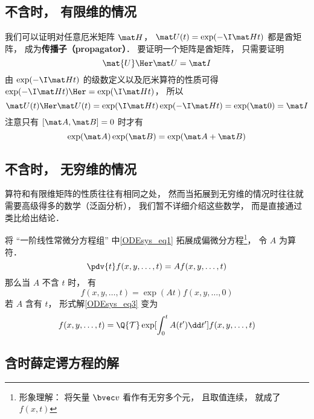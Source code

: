 

\subsection{不含时， 有限维的情况}
我们可以证明对任意厄米矩阵 $\mat H$， $\mat U(t) = \exp(-\I \mat H t)$ 都是酋矩阵， 成为\textbf{传播子（propagator）}． 要证明一个矩阵是酋矩阵， 只需要证明
\begin{equation}
\mat{U}\Her \mat U = \mat I
\end{equation}
由 $\exp(-\I \mat H t)$ 的级数定义以及厄米算符的性质可得 $\exp(-\I \mat H t)\Her = \exp(\I \mat H t)$， 所以
\begin{equation}
\mat U(t)\Her \mat U(t) = \exp(\I \mat H t) \exp(-\I \mat H t) = \exp(\mat 0) = \mat I
\end{equation}
注意只有 $[\mat A, \mat B] = 0$ 时才有
\begin{equation}
\exp(\mat A)\exp(\mat B) = \exp(\mat A + \mat B)
\end{equation}

\subsection{不含时， 无穷维的情况}

算符和有限维矩阵的性质往往有相同之处， 然而当拓展到无穷维的情况时往往就需要高级得多的数学（泛函分析）， 我们暂不详细介绍这些数学， 而是直接通过类比给出结论．

将 “一阶线性常微分方程组” 中\autoref{ODEsys_eq1} 拓展成偏微分方程\footnote{形象理解： 将矢量 $\bvec v$ 看作有无穷多个元， 且取值连续， 就成了 $f(x, t)$}， 令 $A$ 为算符．
\begin{equation}
\pdv{t} f(x, y, \dots, t) = A f(x, y, \dots, t)
\end{equation}
那么当 $A$ 不含 $t$ 时， 有
\begin{equation}
f(x, y, \dots, t) = \exp(A t) f(x, y, \dots, 0)
\end{equation}
若 $A$ 含有 $t$， 形式解\autoref{ODEsys_eq3} 变为
\begin{equation}
f(x, y, \dots, t) = \Q {\mathcal T} \exp[\int_0^ t A(t')\dd t'] f(x, y, \dots, t)
\end{equation}

\subsection{含时薛定谔方程的解}

